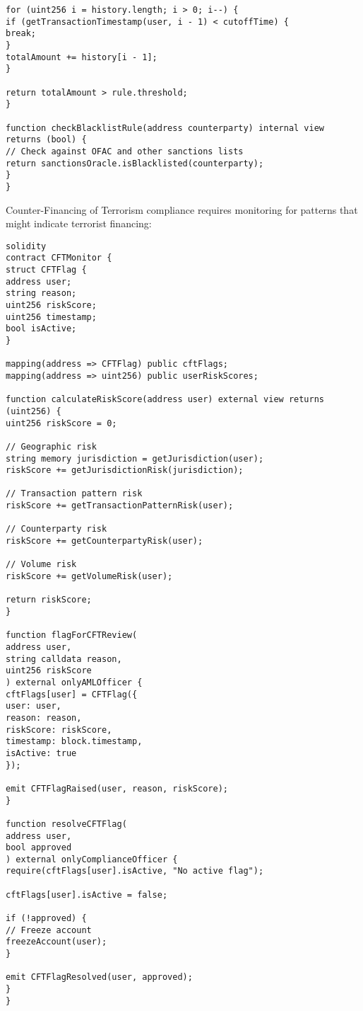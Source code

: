 \documentclass[12pt]{article}
\begin{document}
{{{\begin{lstlisting}
for (uint256 i = history.length; i > 0; i--) {
if (getTransactionTimestamp(user, i - 1) < cutoffTime) {
break;
}
totalAmount += history[i - 1];
}

return totalAmount > rule.threshold;
}

function checkBlacklistRule(address counterparty) internal view returns (bool) {
// Check against OFAC and other sanctions lists
return sanctionsOracle.isBlacklisted(counterparty);
}
}
\end{lstlisting}


Counter-Financing of Terrorism compliance requires monitoring for patterns that might indicate terrorist financing:


\begin{lstlisting}
solidity
contract CFTMonitor {
struct CFTFlag {
address user;
string reason;
uint256 riskScore;
uint256 timestamp;
bool isActive;
}

mapping(address => CFTFlag) public cftFlags;
mapping(address => uint256) public userRiskScores;

function calculateRiskScore(address user) external view returns (uint256) {
uint256 riskScore = 0;

// Geographic risk
string memory jurisdiction = getJurisdiction(user);
riskScore += getJurisdictionRisk(jurisdiction);

// Transaction pattern risk
riskScore += getTransactionPatternRisk(user);

// Counterparty risk
riskScore += getCounterpartyRisk(user);

// Volume risk
riskScore += getVolumeRisk(user);

return riskScore;
}

function flagForCFTReview(
address user,
string calldata reason,
uint256 riskScore
) external onlyAMLOfficer {
cftFlags[user] = CFTFlag({
user: user,
reason: reason,
riskScore: riskScore,
timestamp: block.timestamp,
isActive: true
});

emit CFTFlagRaised(user, reason, riskScore);
}

function resolveCFTFlag(
address user,
bool approved
) external onlyComplianceOfficer {
require(cftFlags[user].isActive, "No active flag");

cftFlags[user].isActive = false;

if (!approved) {
// Freeze account
freezeAccount(user);
}

emit CFTFlagResolved(user, approved);
}
}
\end{lstlisting}

}}}
\end{document}
